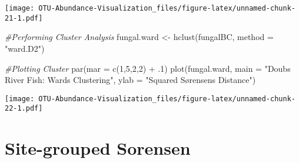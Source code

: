\documentclass[
]{article}
\newenvironment{Shaded}{\begin{snugshade}}{\end{snugshade}}
\newcommand{\AttributeTok}[1]{\textcolor[rgb]{0.77,0.63,0.00}{#1}}
\newcommand{\CommentTok}[1]{\textcolor[rgb]{0.56,0.35,0.01}{\textit{#1}}}
\newcommand{\DecValTok}[1]{\textcolor[rgb]{0.00,0.00,0.81}{#1}}
\newcommand{\FunctionTok}[1]{\textcolor[rgb]{0.00,0.00,0.00}{#1}}
\newcommand{\NormalTok}[1]{#1}
\newcommand{\OtherTok}[1]{\textcolor[rgb]{0.56,0.35,0.01}{#1}}
\newcommand{\SpecialCharTok}[1]{\textcolor[rgb]{0.00,0.00,0.00}{#1}}
\newcommand{\StringTok}[1]{\textcolor[rgb]{0.31,0.60,0.02}{#1}}
\begin{document}
\texttt{[image: OTU-Abundance-Visualization\_files/figure-latex/unnamed-chunk-21-1.pdf]}

\begin{Shaded}
\begin{Highlighting}[]
\CommentTok{\#Performing Cluster Analysis}
\NormalTok{fungal.ward }\OtherTok{\textless{}{-}} \FunctionTok{hclust}\NormalTok{(fungalBC, }\AttributeTok{method =} \StringTok{"ward.D2"}\NormalTok{)}

\CommentTok{\#Plotting Cluster}
\FunctionTok{par}\NormalTok{(}\AttributeTok{mar =} \FunctionTok{c}\NormalTok{(}\DecValTok{1}\NormalTok{,}\DecValTok{5}\NormalTok{,}\DecValTok{2}\NormalTok{,}\DecValTok{2}\NormalTok{) }\SpecialCharTok{+}\NormalTok{ .}\DecValTok{1}\NormalTok{)}
\FunctionTok{plot}\NormalTok{(fungal.ward, }\AttributeTok{main =} \StringTok{"Doubs River Fish: Ward\textquotesingle{}s Clustering"}\NormalTok{,}
     \AttributeTok{ylab =} \StringTok{"Squared Sørensen\textquotesingle{}s Distance"}\NormalTok{)}
\end{Highlighting}
\end{Shaded}

\texttt{[image: OTU-Abundance-Visualization\_files/figure-latex/unnamed-chunk-22-1.pdf]}

\hypertarget{site-grouped-sorensen}{%
\section{Site-grouped Sorensen}\label{site-grouped-sorensen}}
\end{document}
